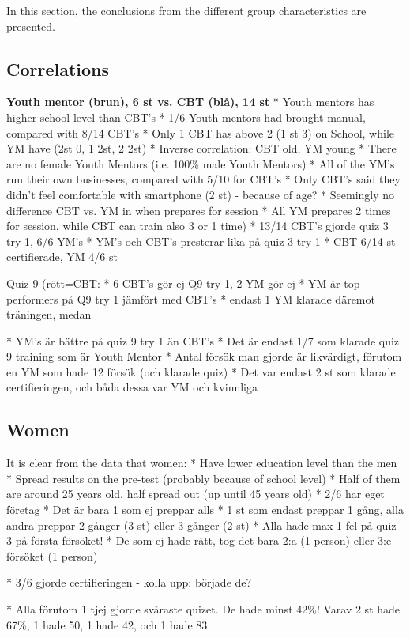 In this section, the conclusions from the different group characteristics are presented.

\subsection{Correlations}

\textbf{Youth mentor (brun), 6 st vs. CBT (blå), 14 st}
* Youth mentors has higher school level than CBT's
* 1/6 Youth mentors had brought manual, compared with 8/14 CBT's
* Only 1 CBT has above 2 (1 st 3) on School, while YM have (2st 0, 1 2st, 2 2st)
* Inverse correlation: CBT old, YM young
* There are no female Youth Mentors (i.e. 100\% male Youth Mentors)
* All of the YM's run their own businesses, compared with 5/10 for CBT's
* Only CBT's said they didn't feel comfortable with smartphone (2 st) - because of age?
* Seemingly no difference CBT vs. YM in when prepares for session
* All YM prepares 2 times for session, while CBT can train also 3 or 1 time)
* 13/14 CBT's gjorde quiz 3 try 1, 6/6 YM's
* YM's och CBT's presterar lika på quiz 3 try 1
* CBT 6/14 st certifierade, YM 4/6 st

Quiz 9 (rött=CBT:
* 6 CBT's gör ej Q9 try 1, 2 YM gör ej
* YM är top performers på Q9 try 1 jämfört med CBT's
* endast 1 YM klarade däremot träningen, medan 

* YM's är bättre på quiz 9 try 1 än CBT's
* Det är endast 1/7 som klarade quiz 9 training som är Youth Mentor
* Antal försök man gjorde är likvärdigt, förutom en YM som hade 12 försök (och klarade quiz)
* Det var endast 2 st som klarade certifieringen, och båda dessa var YM och kvinnliga

\subsection{Women}

It is clear from the data that women:
* Have lower education level than the men
* Spread results on the pre-test (probably because of school level)
* Half of them are around 25 years old, half spread out (up until 45 years old)
* 2/6 har eget företag
* Det är bara 1 som ej preppar alls
* 1 st som endast preppar 1 gång, alla andra preppar 2 gånger (3 st) eller 3 gånger (2 st)
* Alla hade max 1 fel på quiz 3 på första försöket!
* De som ej hade rätt, tog det bara 2:a (1 person) eller 3:e försöket (1 person)

* 3/6 gjorde certifieringen - kolla upp: började de?

* Alla förutom 1 tjej gjorde svåraste quizet. De hade minst 42\%! Varav 2 st hade 67\%, 1 hade 50, 1 hade 42, och 1 hade 83

